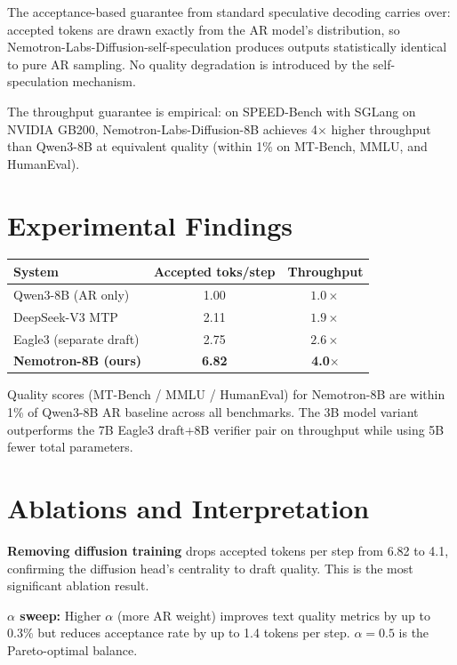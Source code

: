 \documentclass[10pt,twocolumn]{article}
\begin{document}
The acceptance-based guarantee from standard speculative decoding
carries over: accepted tokens are drawn exactly from the AR model's
distribution, so Nemotron-Labs-Diffusion-self-speculation produces
outputs statistically identical to pure AR sampling. No quality
degradation is introduced by the self-speculation mechanism.

The throughput guarantee is empirical: on SPEED-Bench with SGLang on
NVIDIA GB200, Nemotron-Labs-Diffusion-8B achieves 4$\times$ higher
throughput than Qwen3-8B at equivalent quality (within 1\% on MT-Bench,
MMLU, and HumanEval).

\section{Experimental Findings}

\begin{center}
\small
\begin{tabular}{lcc}
\toprule
System & Accepted toks/step & Throughput \\
\midrule
Qwen3-8B (AR only) & 1.00 & $1.0\times$ \\
DeepSeek-V3 MTP & 2.11 & $1.9\times$ \\
Eagle3 (separate draft) & 2.75 & $2.6\times$ \\
\textbf{Nemotron-8B (ours)} & \textbf{6.82} & \textbf{4.0$\times$} \\
\bottomrule
\end{tabular}
\end{center}

Quality scores (MT-Bench / MMLU / HumanEval) for Nemotron-8B are
within 1\% of Qwen3-8B AR baseline across all benchmarks. The 3B
model variant outperforms the 7B Eagle3 draft+8B verifier pair on
throughput while using 5B fewer total parameters.

\section{Ablations and Interpretation}

\textbf{Removing diffusion training} drops accepted tokens per step
from 6.82 to 4.1, confirming the diffusion head's centrality to
draft quality. This is the most significant ablation result.

\textbf{$\alpha$ sweep:} Higher $\alpha$ (more AR weight) improves
text quality metrics by up to 0.3\% but reduces acceptance rate by
up to 1.4 tokens per step. $\alpha = 0.5$ is the Pareto-optimal
balance.
\end{document}

